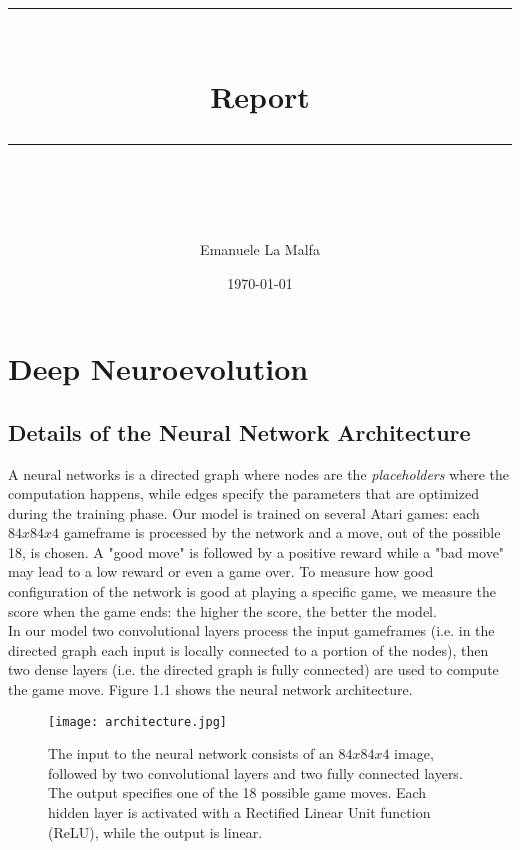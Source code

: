 \documentclass[11pt]{scrartcl} %
\title{	
	\normalfont\normalsize
	\textsc{}\\ %
	\vspace{25pt} %
	\rule{\linewidth}{0.5pt}\\ %
	\vspace{20pt} %
	{\huge Report}\\ %
	\vspace{12pt} %
	\rule{\linewidth}{2pt}\\ %
	\vspace{12pt} %
}
\author{\LARGE Emanuele La Malfa} %
\date{\normalsize\today} %
\begin{document}
\maketitle %

\section{Deep Neuroevolution}

\subsection{Details of the Neural Network Architecture}

A neural networks is a directed graph where nodes are the \textit{placeholders} where the computation happens, while edges specify the parameters that are optimized during the training phase. Our model is trained on several Atari games: each $84x84x4$ gameframe is processed by the network and a move, out of the possible 18, is chosen. A "good move" is followed by a positive reward while a "bad move" may lead to a low reward or even a game over. To measure how good configuration of the network is good at playing a specific game, we measure the score when the game ends: the higher the score, the better the model. \\
In our model two convolutional layers process the input gameframes (i.e. in the directed graph each input is locally connected to a portion of the nodes), then two dense layers (i.e. the directed graph is fully connected) are used to compute the game move. Figure 1.1 shows the neural network architecture. \\

\begin{figure}[h] %
	\centering
	\texttt{[image: architecture.jpg]} %
	\caption{The input to the neural network consists of an $84x84x4$ image, followed by two convolutional layers and two fully connected layers. The output specifies one of the 18 possible game moves. Each hidden layer is activated with a Rectified Linear Unit function (ReLU), while the output is linear.}
\end{figure}
\end{document}
